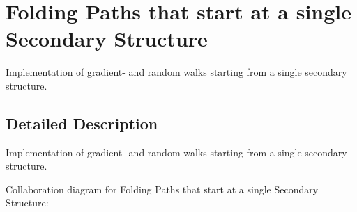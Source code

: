 \hypertarget{group__paths__walk}{}\section{Folding Paths that start at a single Secondary Structure}
\label{group__paths__walk}


Implementation of gradient-\/ and random walks starting from a single secondary structure.  




\subsection{Detailed Description}
Implementation of gradient-\/ and random walks starting from a single secondary structure. 

Collaboration diagram for Folding Paths that start at a single Secondary Structure\+:

